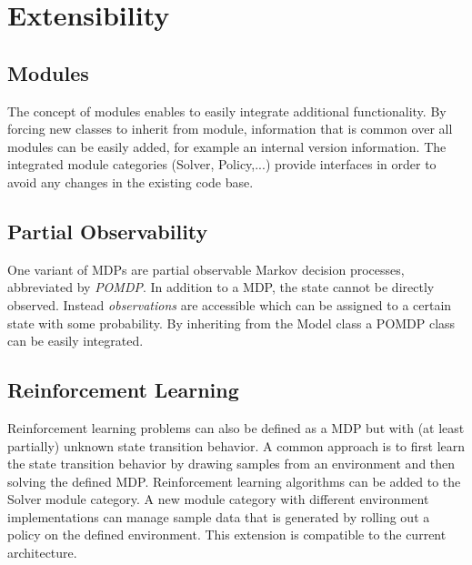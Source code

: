 \chapter{Extensibility}

\section{Modules}

The concept of modules enables to easily integrate additional functionality. By forcing new classes to inherit from module, information that is common over all modules can be easily added, for example an internal version information. The integrated module categories (Solver, Policy,...) provide interfaces in order to avoid any changes in the existing code base. 

\section{Partial Observability}

One variant of MDPs are partial observable Markov decision processes, abbreviated by \emph{POMDP}. In addition to a MDP, the state cannot be directly observed. Instead \emph{observations} are accessible which can be assigned to a certain state with some probability. By inheriting from the Model class a POMDP class can be easily integrated. 

\section{Reinforcement Learning}

Reinforcement learning problems can also be defined as a MDP but with (at least partially) unknown state transition behavior. A common approach is to first learn the state transition behavior by drawing samples from an environment and then solving the defined MDP. Reinforcement learning algorithms can be added to the Solver module category. A new module category with different environment implementations can manage sample data that is generated by rolling out a policy on the defined environment. This extension is compatible to the current architecture.  